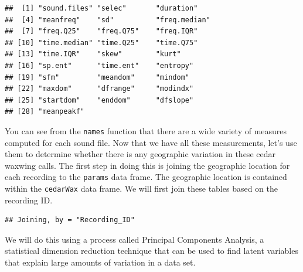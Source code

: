 \documentclass[
]{krantz}
\newenvironment{Shaded}{\begin{snugshade}}{\end{snugshade}}
\newcommand{\CharTok}[1]{\textcolor[rgb]{0.31,0.60,0.02}{#1}}
\newcommand{\KeywordTok}[1]{\textcolor[rgb]{0.13,0.29,0.53}{\textbf{#1}}}
\newcommand{\NormalTok}[1]{#1}
\newcommand{\OperatorTok}[1]{\textcolor[rgb]{0.81,0.36,0.00}{\textbf{#1}}}
\newcommand{\StringTok}[1]{\textcolor[rgb]{0.31,0.60,0.02}{#1}}
\begin{document}
\begin{verbatim}
##  [1] "sound.files" "selec"       "duration"   
##  [4] "meanfreq"    "sd"          "freq.median"
##  [7] "freq.Q25"    "freq.Q75"    "freq.IQR"   
## [10] "time.median" "time.Q25"    "time.Q75"   
## [13] "time.IQR"    "skew"        "kurt"       
## [16] "sp.ent"      "time.ent"    "entropy"    
## [19] "sfm"         "meandom"     "mindom"     
## [22] "maxdom"      "dfrange"     "modindx"    
## [25] "startdom"    "enddom"      "dfslope"    
## [28] "meanpeakf"
\end{verbatim}

You can see from the \texttt{names} function that there are a wide variety of measures computed for each sound file. Now that we have all these measurements, let's use them to determine whether there is any geographic variation in these cedar waxwing calls. The first step in doing this is joining the geographic location for each recording to the \texttt{params} data frame. The geographic location is contained within the \texttt{cedarWax} data frame. We will first join these tables based on the recording ID.

\begin{Shaded}
\end{Shaded}

\begin{verbatim}
## Joining, by = "Recording_ID"
\end{verbatim}

We will do this using a process called Principal Components Analysis, a statistical dimension reduction technique that can be used to find latent variables that explain large amounts of variation in a data set.
\end{document}
